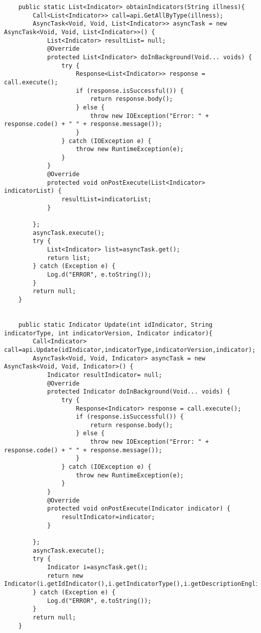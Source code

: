 \begin{itemize}
\begin{itemize}
\begin{lstlisting}
    public static List<Indicator> obtainIndicators(String illness){
        Call<List<Indicator>> call=api.GetAllByType(illness);
        AsyncTask<Void, Void, List<Indicator>> asyncTask = new AsyncTask<Void, Void, List<Indicator>>() {
            List<Indicator> resultList= null;
            @Override
            protected List<Indicator> doInBackground(Void... voids) {
                try {
                    Response<List<Indicator>> response = call.execute();
                    if (response.isSuccessful()) {
                        return response.body();
                    } else {
                        throw new IOException("Error: " + response.code() + " " + response.message());
                    }
                } catch (IOException e) {
                    throw new RuntimeException(e);
                }
            }
            @Override
            protected void onPostExecute(List<Indicator> indicatorList) {
                resultList=indicatorList;
            }

        };
        asyncTask.execute();
        try {
            List<Indicator> list=asyncTask.get();
            return list;
        } catch (Exception e) {
            Log.d("ERROR", e.toString());
        }
        return null;
    }


    public static Indicator Update(int idIndicator, String indicatorType, int indicatorVersion, Indicator indicator){
        Call<Indicator> call=api.Update(idIndicator,indicatorType,indicatorVersion,indicator);
        AsyncTask<Void, Void, Indicator> asyncTask = new AsyncTask<Void, Void, Indicator>() {
            Indicator resultIndicator= null;
            @Override
            protected Indicator doInBackground(Void... voids) {
                try {
                    Response<Indicator> response = call.execute();
                    if (response.isSuccessful()) {
                        return response.body();
                    } else {
                        throw new IOException("Error: " + response.code() + " " + response.message());
                    }
                } catch (IOException e) {
                    throw new RuntimeException(e);
                }
            }
            @Override
            protected void onPostExecute(Indicator indicator) {
                resultIndicator=indicator;
            }

        };
        asyncTask.execute();
        try {
            Indicator i=asyncTask.get();
            return new Indicator(i.getIdIndicator(),i.getIndicatorType(),i.getDescriptionEnglish(),i.getDescriptionSpanish(),i.getDescriptionFrench(),i.getPriority(),i.getIndicatorVersion());
        } catch (Exception e) {
            Log.d("ERROR", e.toString());
        }
        return null;
    }


\end{lstlisting}
\end{itemize}
\end{itemize}
